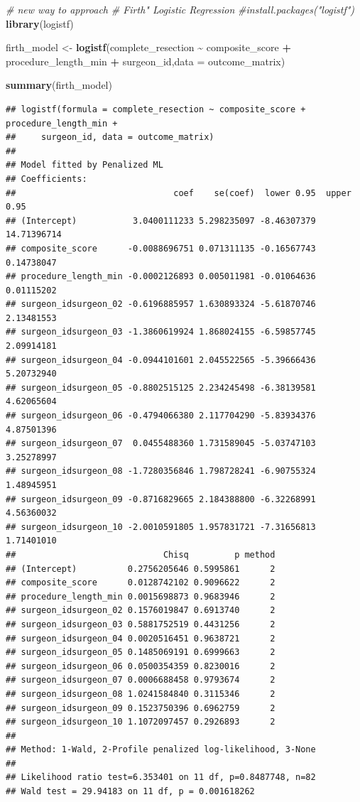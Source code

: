 \documentclass[
]{article}
\newenvironment{Shaded}{\begin{snugshade}}{\end{snugshade}}
\newcommand{\AttributeTok}[1]{\textcolor[rgb]{0.13,0.29,0.53}{#1}}
\newcommand{\CommentTok}[1]{\textcolor[rgb]{0.56,0.35,0.01}{\textit{#1}}}
\newcommand{\FunctionTok}[1]{\textcolor[rgb]{0.13,0.29,0.53}{\textbf{#1}}}
\newcommand{\NormalTok}[1]{#1}
\newcommand{\OtherTok}[1]{\textcolor[rgb]{0.56,0.35,0.01}{#1}}
\newcommand{\SpecialCharTok}[1]{\textcolor[rgb]{0.81,0.36,0.00}{\textbf{#1}}}
\begin{document}
\begin{Shaded}
\begin{Highlighting}[]
\CommentTok{\# new way to approach }
\CommentTok{\# Firth" Logistic Regression}
\CommentTok{\#install.packages("logistf")}
\FunctionTok{library}\NormalTok{(logistf)}

\NormalTok{firth\_model }\OtherTok{\textless{}{-}} \FunctionTok{logistf}\NormalTok{(complete\_resection }\SpecialCharTok{\textasciitilde{}}\NormalTok{ composite\_score }\SpecialCharTok{+}\NormalTok{ procedure\_length\_min }\SpecialCharTok{+}\NormalTok{ surgeon\_id,}\AttributeTok{data =}\NormalTok{ outcome\_matrix)}

\FunctionTok{summary}\NormalTok{(firth\_model)}
\end{Highlighting}
\end{Shaded}

\begin{verbatim}
## logistf(formula = complete_resection ~ composite_score + procedure_length_min + 
##     surgeon_id, data = outcome_matrix)
## 
## Model fitted by Penalized ML
## Coefficients:
##                               coef    se(coef)  lower 0.95  upper 0.95
## (Intercept)           3.0400111233 5.298235097 -8.46307379 14.71396714
## composite_score      -0.0088696751 0.071311135 -0.16567743  0.14738047
## procedure_length_min -0.0002126893 0.005011981 -0.01064636  0.01115202
## surgeon_idsurgeon_02 -0.6196885957 1.630893324 -5.61870746  2.13481553
## surgeon_idsurgeon_03 -1.3860619924 1.868024155 -6.59857745  2.09914181
## surgeon_idsurgeon_04 -0.0944101601 2.045522565 -5.39666436  5.20732940
## surgeon_idsurgeon_05 -0.8802515125 2.234245498 -6.38139581  4.62065604
## surgeon_idsurgeon_06 -0.4794066380 2.117704290 -5.83934376  4.87501396
## surgeon_idsurgeon_07  0.0455488360 1.731589045 -5.03747103  3.25278997
## surgeon_idsurgeon_08 -1.7280356846 1.798728241 -6.90755324  1.48945951
## surgeon_idsurgeon_09 -0.8716829665 2.184388800 -6.32268991  4.56360032
## surgeon_idsurgeon_10 -2.0010591805 1.957831721 -7.31656813  1.71401010
##                             Chisq         p method
## (Intercept)          0.2756205646 0.5995861      2
## composite_score      0.0128742102 0.9096622      2
## procedure_length_min 0.0015698873 0.9683946      2
## surgeon_idsurgeon_02 0.1576019847 0.6913740      2
## surgeon_idsurgeon_03 0.5881752519 0.4431256      2
## surgeon_idsurgeon_04 0.0020516451 0.9638721      2
## surgeon_idsurgeon_05 0.1485069191 0.6999663      2
## surgeon_idsurgeon_06 0.0500354359 0.8230016      2
## surgeon_idsurgeon_07 0.0006688458 0.9793674      2
## surgeon_idsurgeon_08 1.0241584840 0.3115346      2
## surgeon_idsurgeon_09 0.1523750396 0.6962759      2
## surgeon_idsurgeon_10 1.1072097457 0.2926893      2
## 
## Method: 1-Wald, 2-Profile penalized log-likelihood, 3-None
## 
## Likelihood ratio test=6.353401 on 11 df, p=0.8487748, n=82
## Wald test = 29.94183 on 11 df, p = 0.001618262
\end{verbatim}
\end{document}
